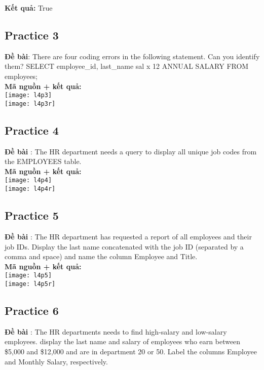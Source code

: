\documentclass[a4paper]{report}
\begin{document}
\textbf{Kết quả: } True

\subsection{Practice 3}
\noindent
\textbf{Đề bài}: There are four coding errors in the following statement. Can you identify them? SELECT employee\_id, last\_name sal x 12 ANNUAL SALARY FROM employees;\\

\textbf{Mã nguồn + kết quả: }\\
\texttt{[image: l4p3]}\\
\texttt{[image: l4p3r]}

\subsection{Practice 4}\noindent
\textbf{Đề bài} : The HR department needs a query to display all unique job codes from the EMPLOYEES table.\\

\textbf{Mã nguồn + kết quả: }\\
\texttt{[image: l4p4]}\\
\texttt{[image: l4p4r]}

\subsection{Practice 5}\noindent
\textbf{Đề bài} : The HR department has requested a report of all employees and their job IDs. Display the last name concatenated with the job ID (separated by a comma and space) and name the column Employee and Title.\\

\textbf{Mã nguồn + kết quả: }\\
\texttt{[image: l4p5]}\\
\texttt{[image: l4p5r]}

\subsection{Practice 6}\noindent
\textbf{Đề bài} : The HR departments needs to find high-salary and low-salary employees. display the last name and salary of employees who earn between \$5,000 and \$12,000 and are in department 20 or 50. Label the columns Employee and Monthly Salary, respectively.\\
\end{document}
